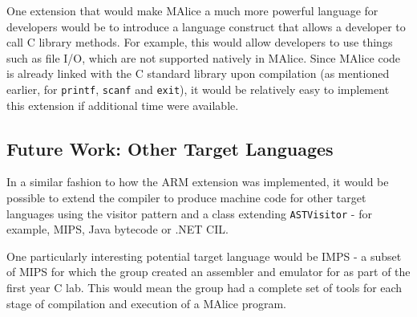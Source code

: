 \documentclass[a4wide, 11pt]{article}
\begin{document}
One extension that would make MAlice a much more powerful language for 
developers would be to introduce a language construct that allows a developer 
to call C library methods. For example, this would allow developers to use 
things such as file I/O, which are not supported natively in MAlice. Since 
MAlice code is already linked with the C standard library upon compilation
(as mentioned earlier, for \texttt{printf}, \texttt{scanf} and \texttt{exit}),
it would be relatively easy to implement this extension if additional time
were available.

\subsection{Future Work: Other Target Languages}
In a similar fashion to how the ARM extension was implemented, it would be 
possible to extend the compiler to produce machine code for other target 
languages using the visitor pattern and a class extending \texttt{ASTVisitor} -
for example, MIPS, Java bytecode or .NET CIL. 

One particularly interesting potential target language would be IMPS - a subset
of MIPS for which the group created an assembler and emulator for as part of the
first year C lab. This would mean the group had a complete set of tools for
each stage of compilation and execution of a MAlice program.

\enddocument
\end{document}
